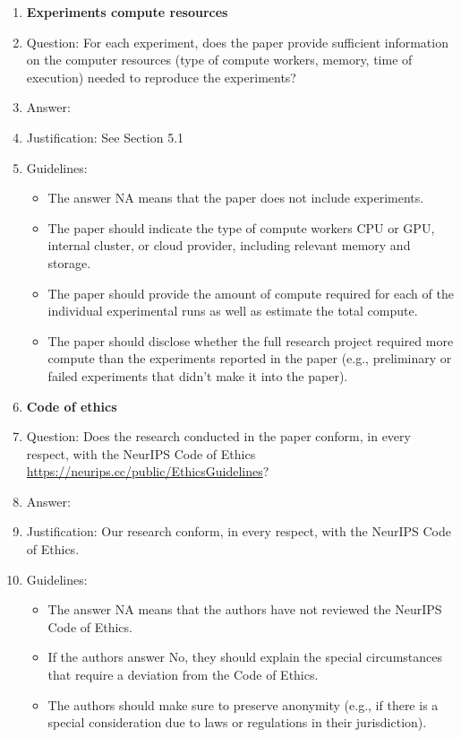 \documentclass{article}
\theoremstyle{plain}
\theoremstyle{definition}
\theoremstyle{remark}
\begin{document}
\begin{enumerate}
\item {\bf Experiments compute resources}
    \item[] Question: For each experiment, does the paper provide sufficient information on the computer resources (type of compute workers, memory, time of execution) needed to reproduce the experiments?
    \item[] Answer: \answerYes{} %
    \item[] Justification: See Section 5.1 
    \item[] Guidelines:
    \begin{itemize}
        \item The answer NA means that the paper does not include experiments.
        \item The paper should indicate the type of compute workers CPU or GPU, internal cluster, or cloud provider, including relevant memory and storage.
        \item The paper should provide the amount of compute required for each of the individual experimental runs as well as estimate the total compute. 
        \item The paper should disclose whether the full research project required more compute than the experiments reported in the paper (e.g., preliminary or failed experiments that didn't make it into the paper). 
    \end{itemize}
    
\item {\bf Code of ethics}
    \item[] Question: Does the research conducted in the paper conform, in every respect, with the NeurIPS Code of Ethics \url{https://neurips.cc/public/EthicsGuidelines}?
    \item[] Answer: \answerYes{} %
    \item[] Justification: Our research conform, in every respect, with the NeurIPS Code of Ethics.
    \item[] Guidelines:
    \begin{itemize}
        \item The answer NA means that the authors have not reviewed the NeurIPS Code of Ethics.
        \item If the authors answer No, they should explain the special circumstances that require a deviation from the Code of Ethics.
        \item The authors should make sure to preserve anonymity (e.g., if there is a special consideration due to laws or regulations in their jurisdiction).
    \end{itemize}



\end{enumerate}
\end{document}
